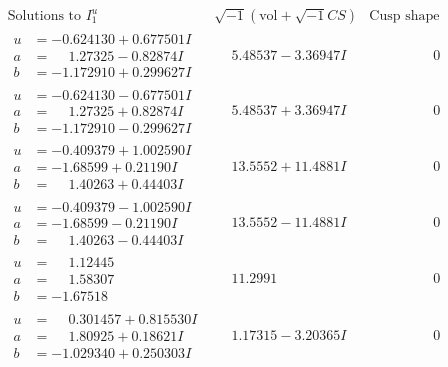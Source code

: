 \documentclass[1p]{elsarticle_modified}
\theoremstyle{definition}
\newcommand{\I}{\sqrt{-1}}
\begin{document}
$$\begin{array}{c|c|c}  
\text{Solutions to }I^u_{1}& \I (\text{vol} + \sqrt{-1}CS) & \text{Cusp shape}\\
 \hline 
\begin{aligned}
u &= -0.624130 + 0.677501 I \\
a &= \phantom{-}1.27325 - 0.82874 I \\
b &= -1.172910 + 0.299627 I\end{aligned}
 & \phantom{-}5.48537 - 3.36947 I & \phantom{-0.000000 } 0 \\ \hline\begin{aligned}
u &= -0.624130 - 0.677501 I \\
a &= \phantom{-}1.27325 + 0.82874 I \\
b &= -1.172910 - 0.299627 I\end{aligned}
 & \phantom{-}5.48537 + 3.36947 I & \phantom{-0.000000 } 0 \\ \hline\begin{aligned}
u &= -0.409379 + 1.002590 I \\
a &= -1.68599 + 0.21190 I \\
b &= \phantom{-}1.40263 + 0.44403 I\end{aligned}
 & \phantom{-}13.5552 + 11.4881 I & \phantom{-0.000000 } 0 \\ \hline\begin{aligned}
u &= -0.409379 - 1.002590 I \\
a &= -1.68599 - 0.21190 I \\
b &= \phantom{-}1.40263 - 0.44403 I\end{aligned}
 & \phantom{-}13.5552 - 11.4881 I & \phantom{-0.000000 } 0 \\ \hline\begin{aligned}
u &= \phantom{-}1.12445\phantom{ +0.000000I} \\
a &= \phantom{-}1.58307\phantom{ +0.000000I} \\
b &= -1.67518\phantom{ +0.000000I}\end{aligned}
 & \phantom{-}11.2991\phantom{ +0.000000I} & \phantom{-0.000000 } 0 \\ \hline\begin{aligned}
u &= \phantom{-}0.301457 + 0.815530 I \\
a &= \phantom{-}1.80925 + 0.18621 I \\
b &= -1.029340 + 0.250303 I\end{aligned}
 & \phantom{-}1.17315 - 3.20365 I & \phantom{-0.000000 } 0 \\ \hline\begin{aligned}

\end{aligned}
\end{array}$$
\end{document}
